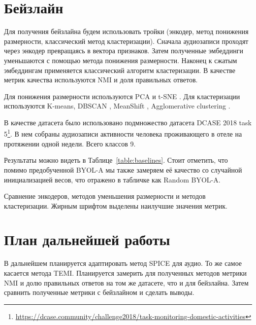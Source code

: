 \documentclass[a4paper,12pt]{extarticle}
\begin{document}
\section{Бейзлайн}

Для получения бейзлайна будем использовать тройки 
(энкодер, метод понижения размерности, классический 
метод кластеризации). Сначала аудиозаписи проходят 
через энкодер превращаясь в вектора признаков. 
Затем полученные эмбеддинги уменьшаются с помощью метода
понижения размерности. Наконец к сжатым эмбеддингам 
применяется классический алгоритм кластеризации. 
В качестве метрик качества используются NMI и доля 
правильных ответов.

Для понижения размерности используются PCA \cite{PCA_overview} и 
t-SNE \cite{JMLR:v9:vandermaaten08a}. Для кластеризации 
используются K-means, DBSCAN \cite{ester1996density}, 
MeanShift \cite{fukunaga1975estimation}, Agglomerative 
clustering \cite{agglomerative}.

В качестве датасета было использовано подмножество 
датасета DCASE 2018 task 5\footnote{\url{https://dcase.community/challenge2018/task-monitoring-domestic-activities}}.
В нем собраны аудиозаписи активности человека проживающего в 
отеле на протяжении одной недели. Всего классов 9. 

Результаты можно видеть в Таблице~\ref{table:baselines}. 
Стоит отметить, что помимо предобученной BYOL-A мы 
также замеряем её качество со случайной инициализацией 
весов, что отражено в табличке как Random BYOL-A.
\begin{table}[]
    \footnotesize
	\centering

	\caption{Сравнение энкодеров, методов уменьшения размерности и методов кластеризации.
	Жирным шрифтом выделены наилучшие значения метрик.}
	\label{table:baselines}
\end{table}

\section{План дальнейшей работы}

В дальнейшем планируется адаптировать метод SPICE для аудио.
То же самое касается метода TEMI. Планируется замерить для 
полученных методов метрики NMI и долю правильных ответов на том же
датасете, что и для бейзлайна. Затем сравнить полученные метрики с 
бейзлайном и сделать выводы. 
	
\newpage 
\printbibliography[heading=bibintoc] 
	
\end{document}

